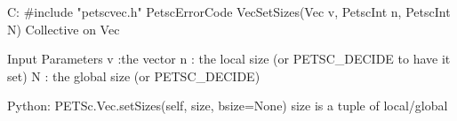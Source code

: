 C:
#include "petscvec.h"
PetscErrorCode  VecSetSizes(Vec v, PetscInt n, PetscInt N)
Collective on Vec

Input Parameters
v :the vector
n : the local size (or PETSC_DECIDE to have it set)
N : the global size (or PETSC_DECIDE)

Python:
PETSc.Vec.setSizes(self, size, bsize=None)
size is a tuple of local/global
